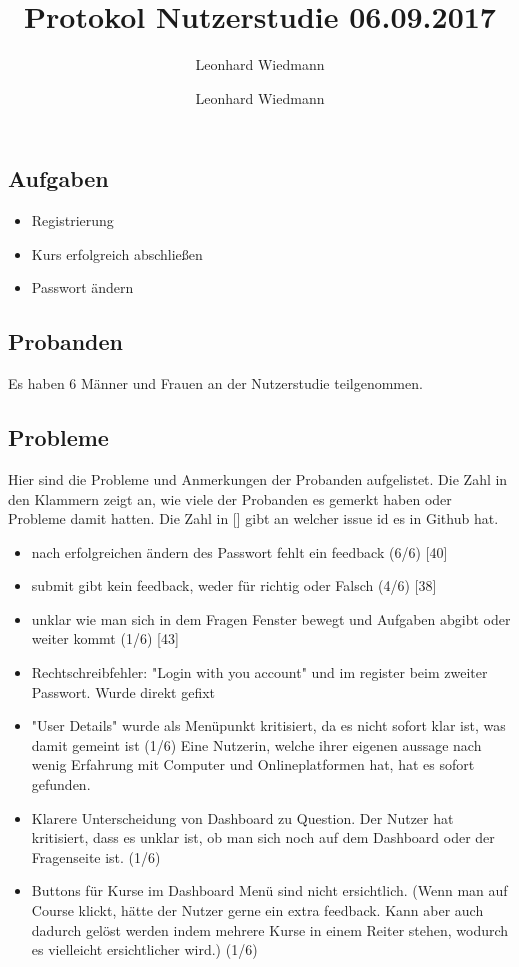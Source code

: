 \documentclass[colorback, accentcolor=tud1c, paper=a4]{tudexercise}
\title{Protokol Nutzerstudie 06.09.2017}
\subtitle{Leonhard Wiedmann}
\author{Leonhard Wiedmann}
\begin{document}
\maketitle
\subsection*{Aufgaben}
	\begin{itemize}
	\item Registrierung
  \item Kurs erfolgreich abschließen
  \item Passwort ändern
	\end{itemize}

\subsection*{Probanden}
Es haben 6 Männer und Frauen an der Nutzerstudie teilgenommen.

\subsection*{Probleme}
  Hier sind die Probleme und Anmerkungen der Probanden aufgelistet. Die Zahl in den Klammern zeigt an, wie viele der Probanden es gemerkt haben oder Probleme damit hatten. Die Zahl in [] gibt an welcher issue id es in Github hat.
  \begin{itemize}
    \item nach erfolgreichen ändern des Passwort fehlt ein feedback (6/6) [40]
		\item submit gibt kein feedback, weder für richtig oder Falsch (4/6) [38]
		\item unklar wie man sich in dem Fragen Fenster bewegt und Aufgaben abgibt oder weiter kommt (1/6) [43]
		\item Rechtschreibfehler: "Login with you account" und im register beim zweiter Passwort. Wurde direkt gefixt
		\item "User Details" wurde als Menüpunkt kritisiert, da es nicht sofort klar ist, was damit gemeint ist (1/6) {Eine Nutzerin, welche ihrer eigenen aussage nach wenig Erfahrung mit Computer und Onlineplatformen hat, hat es sofort gefunden. }
		\item Klarere Unterscheidung von Dashboard zu Question. Der Nutzer hat kritisiert, dass es unklar ist, ob man sich noch auf dem Dashboard oder der Fragenseite ist. (1/6)
    \item Buttons für Kurse im Dashboard Menü sind nicht ersichtlich. (Wenn man auf Course klickt, hätte der Nutzer gerne ein extra feedback. Kann aber auch dadurch gelöst werden indem mehrere Kurse in einem Reiter stehen, wodurch es vielleicht ersichtlicher wird.) (1/6) 
   \end{itemize}
\end{document}
